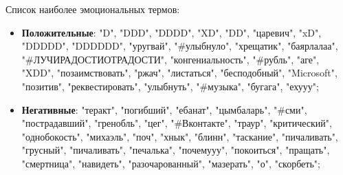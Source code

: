 Список наиболее эмоциональных термов:
\begin{itemize}
\item {\bf Положительные}: "D", "DDD", "DDDD", "XD", "DD", "царевич", "xD",
    "DDDDD", "DDDDDD", "уругвай", "\#улыбнуло", "хрещатик", "баярлалаа",
    "\#ЛУЧИРАДОСТИОТРАДОСТИ", "конгениальность", "\#рубль", "аге", "XDD",
    "позаимствовать", "ржач", "листаться", "бесподобный", "Microsoft",
    "позитив", "реквестировать", "улыбнуть", "\#музыка", "бугага", "ехууу";

\item {\bf Негативные}: "теракт", "погибший", "ебанат", "цымбаларь", "\#сми",
    "пострадавший", "гренобль", "цег", "\#Вконтакте", "траур", "критический",
    "однобокость", "михаэль", "поч", "хнык", "блинн", "таскание",
    "пичаливать", "грусный", "пичаливать", "печалька", "почемууу",
    "покоиться", "пращать", "смертница", "навидеть", "разочарованный",
    "мазерать", "о", "скорбеть";
\end{itemize}
